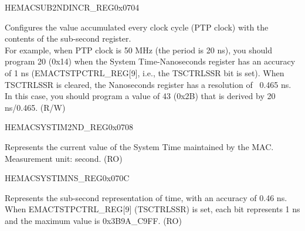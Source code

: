 \begin{register}{H}{EMACSUB2NDINCR\_REG}{0x0704}\label{regdesc:EMACSUBSECONDINCRREG}
%
%
\regnewline%
\begin{regdesc}\begin{reglist}
\item [SSINC] Configures the value accumulated every clock cycle (PTP clock) with the contents of the sub-second register.\\
For example, when PTP clock is 50 MHz (the period is 20 ns), you should program 20 (0x14) when the System Time-Nanoseconds register has an accuracy of 1 ns (EMACTSTPCTRL\_REG[9], i.e., the TSCTRLSSR bit is set). When TSCTRLSSR is cleared, the Nanoseconds register has a resolution of ~0.465 ns. In this case, you should program a value of 43 (0x2B) that is derived by 20 ns/0.465. (R/W)
\end{reglist}\end{regdesc}
\end{register}

\begin{register}{H}{EMACSYSTIM2ND\_REG}{0x0708}\label{regdesc:EMACSYSTEMTIMESREG}
%
\regnewline%
\begin{regdesc}\begin{reglist}
\item [TSS] Represents the current value of the System Time maintained by the MAC.\\
Measurement unit: second. (RO)
\end{reglist}\end{regdesc}
\end{register}

\begin{register}{H}{EMACSYSTIMNS\_REG}{0x070C}\label{regdesc:EMACSYSTEMTIMENANOSSREG}
%
%
\regnewline%
\begin{regdesc}\begin{reglist}
\item [TSSS] Represents the sub-second representation of time, with an accuracy of 0.46 ns.\\
When EMACTSTPCTRL\_REG[9] (TSCTRLSSR) is set, each bit represents 1 ns and the maximum value is 0x3B9A\_C9FF. (RO)
\end{reglist}\end{regdesc}
\end{register}

